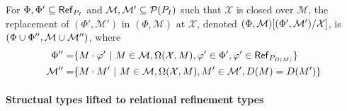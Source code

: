 For $\Phi, \Phi' \subseteq \refpreds{ \idxpos{I} }$ and %
$\mathcal{M}, \mathcal{M}' \subseteq \pset(\idxpos{I})$ such that
$\mathcal{X}$ is closed over $\mathcal{M}$, the replacement of
$(\Phi', \mathcal{M}')$ in $(\Phi, \mathcal{M})$ at $\mathcal{X}$,
denoted
$\replace{(\Phi, \mathcal{M})}{ \mathcal{X} }{(\Phi', \mathcal{M}')}$,
is $(\Phi \union \Phi'', \mathcal{M} \union \mathcal{M}'')$, where
%
\begin{align*}
  \Phi'' = & %
             \setformer{ M \concat \varphi' }{ 
             M \in \mathcal{M}, \terminates{ \mathcal{X} }{ M },
             \varphi' \in \Phi', %
             \varphi' \in \refpreds{ \idxpos{ \domain(M) } } } \\
  \mathcal{M}'' = & %
                    \setformer{ M \concat M' }{
                    M \in \mathcal{M},
                    \terminates{ \mathcal{X} }{ M },
                    M' \in \mathcal{M}',
                    \domain(M) = \domain(M') }
\end{align*}

\paragraph{Structual types lifted to relational refinement types}

